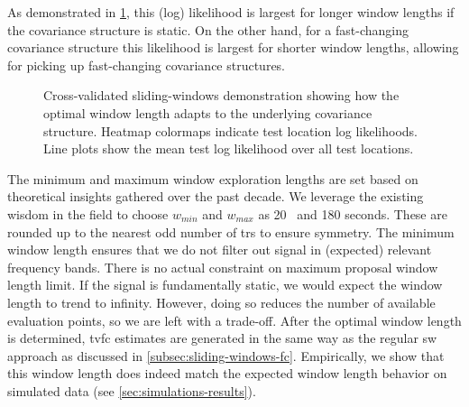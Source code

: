 As demonstrated in \cref{fig:sw-cv-demo}, this (log) likelihood is largest for longer window lengths if the covariance structure is static.
On the other hand, for a fast-changing covariance structure this likelihood is largest for shorter window lengths, allowing for picking up fast-changing covariance structures.


\begin{figure}[t]
  \centering
  \caption{
    Cross-validated sliding-windows demonstration showing how the optimal window length adapts to the underlying covariance structure.
    Heatmap colormaps indicate test location log likelihoods.
    Line plots show the mean test log likelihood over all test locations.
  }\label{fig:sw-cv-demo}
\end{figure}


The minimum and maximum window exploration lengths are set based on theoretical insights gathered over the past decade.
We leverage the existing wisdom in the field to choose $w_{min}$ and $w_{max}$ as 20~\parencite{Leonardi2015} and 180 seconds.
These are rounded up to the nearest odd number of \glspl{tr} to ensure symmetry.
%
The minimum window length ensures that we do not filter out signal in (expected) relevant frequency bands.
There is no actual constraint on maximum proposal window length limit.
If the signal is fundamentally static, we would expect the window length to trend to infinity.
However, doing so reduces the number of available evaluation points, so we are left with a trade-off.
%
After the optimal window length is determined, \gls{tvfc} estimates are generated in the same way as the regular \gls{sw} approach as discussed in \cref{subsec:sliding-windows-fc}.
%
Empirically, we show that this window length does indeed match the expected window length behavior on simulated data (see \cref{sec:simulations-results}).
